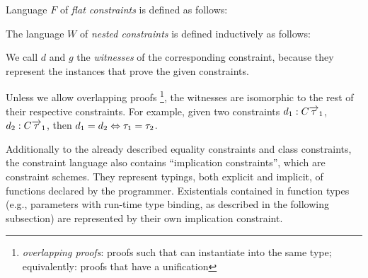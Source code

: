 \begin{defn}
    \label{def:defer_constr}

    Language $F$ of \emph{flat constraints} is defined as follows:

    \begin{center}\begin{grammar}
    \end{grammar}\end{center}

    The language $W$ of \emph{nested constraints} is defined inductively as follows:

    \begin{center}\begin{grammar}
    \end{grammar}\end{center}

    \label{constraint_language}
\end{defn}

We call $d$ and $g$ the \emph{witnesses} of the corresponding constraint, because they represent the instances that prove the given constraints.

Unless we allow overlapping proofs \footnote{\emph{overlapping proofs}: proofs such that can instantiate into the same type; equivalently: proofs that have a unification}, the witnesses are isomorphic to the rest of their respective constraints. For example, given two constraints $d_1: C \overrightarrow{\tau}_1$, $d_2: C \overrightarrow{\tau}_1$, then $d_1 = d_2 \Leftrightarrow \tau_1 = \tau_2$.

Additionally to the already described equality constraints and class constraints, the constraint language also contains ``implication constraints'', which are constraint schemes. They represent typings, both explicit and implicit, of functions declared by the programmer. Existentials contained in function types (e.g., parameters with run-time type binding, as described in the following subsection) are represented by their own implication constraint.


